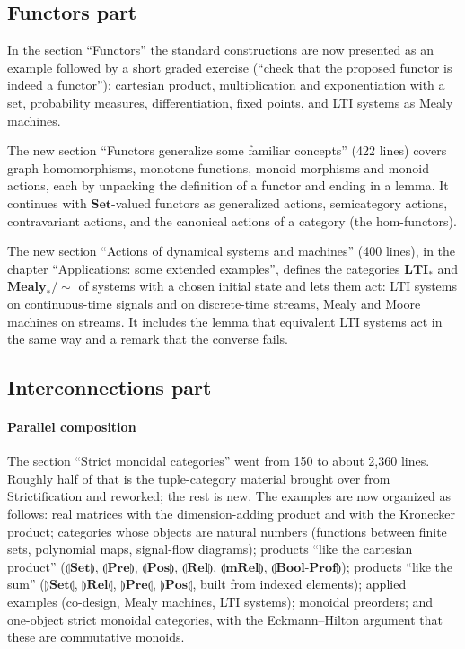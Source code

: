 \documentclass[11pt,a4paper]{article}
\newcommand{\cat}[1]{\mathbf{#1}}
\newcommand{\tL}[1]{\llparenthesis\mathbf{#1}\rrparenthesis}   %
\newcommand{\tR}[1]{\rrparenthesis\mathbf{#1}\llparenthesis}   %
\begin{document}
\subsection{Functors part}

In the section ``Functors'' the standard constructions are now presented as an example followed
by a short graded exercise (``check that the proposed functor is indeed a functor''): cartesian
product, multiplication and exponentiation with a set, probability measures, differentiation,
fixed points, and LTI systems as Mealy machines.

The new section ``Functors generalize some familiar concepts'' (422 lines) covers graph
homomorphisms, monotone functions, monoid morphisms and monoid actions, each by unpacking the
definition of a functor and ending in a lemma. It continues with $\cat{Set}$-valued functors as
generalized actions, semicategory actions, contravariant actions, and the canonical actions of a
category (the hom-functors).

The new section ``Actions of dynamical systems and machines'' (400 lines), in the chapter
``Applications: some extended examples'', defines the categories $\cat{LTI}_*$ and
$\cat{Mealy}_*/{\sim}$ of systems with a chosen initial state and lets them act: LTI systems on
continuous-time signals and on discrete-time streams, Mealy and Moore machines on streams. It
includes the lemma that equivalent LTI systems act in the same way and a remark that the converse
fails.

\subsection{Interconnections part}

\paragraph{Parallel composition} The section ``Strict monoidal categories'' went from 150 to
about 2{,}360 lines. Roughly half of that is the tuple-category material brought over from
Strictification and reworked; the rest is new. The examples are now organized as follows: real
matrices with the dimension-adding product and with the Kronecker product; categories whose
objects are natural numbers (functions between finite sets, polynomial maps, signal-flow
diagrams); products ``like the cartesian product'' ($\tL{Set}$, $\tL{Pre}$, $\tL{Pos}$,
$\tL{Rel}$, $\tL{mRel}$, $\tL{Bool\text{-}Prof}$); products ``like the sum'' ($\tR{Set}$,
$\tR{Rel}$, $\tR{Pre}$, $\tR{Pos}$, built from indexed elements); applied examples (co-design,
Mealy machines, LTI systems); monoidal preorders; and one-object strict monoidal categories, with
the Eckmann--Hilton argument that these are commutative monoids.
\end{document}
